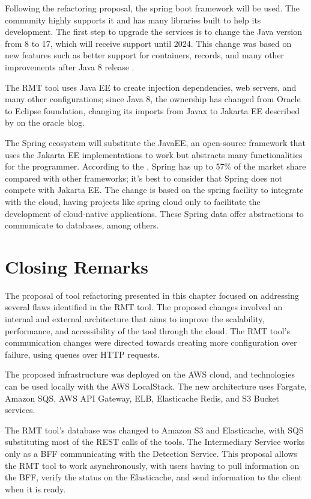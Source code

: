 Following the refactoring proposal, the spring boot framework will be used. The community highly supports it and has many libraries built to help its development.
The first step to upgrade the services is to change the Java version from 8 to 17, which will receive support until 2024. This change was based on new features such as better support for containers, records, and many other improvements after Java 8 release \cite{java8to17}. 

The RMT tool uses Java EE to create injection dependencies, web servers, and many other configurations; since Java 8, the ownership has changed from Oracle to Eclipse foundation, changing its imports from Javax to Jakarta EE described by \textcite{java8to17} on the oracle blog.

The Spring ecosystem will substitute the JavaEE, an open-source framework that uses the Jakarta EE implementations to work but abstracts many functionalities for the programmer. According to the \textcite{javasurvey}, Spring has up to 57\% of the market share compared with other frameworks; it's best to consider that Spring does not compete with Jakarta EE. The change is based on the spring facility to integrate with the cloud, having projects like spring cloud only to facilitate the development of cloud-native applications. These Spring data offer abstractions to communicate to databases, among others.

\section{Closing Remarks}
\label{sec-closingproposal}
The proposal of tool refactoring presented in this chapter focused on addressing several flaws identified in the RMT tool. The proposed changes involved an internal and external architecture that aims to improve the scalability, performance, and accessibility of the tool through the cloud. The RMT tool's communication changes were directed towards creating more configuration over failure, using queues over HTTP requests. 

The proposed infrastructure was deployed on the AWS cloud, and technologies can be used locally with the AWS LocalStack. The new architecture uses Fargate, Amazon SQS, AWS API Gateway, ELB, Elasticache Redis, and S3 Bucket services. 

The RMT tool's database was changed to Amazon S3 and Elasticache, with SQS substituting most of the REST calls of the tools. The Intermediary Service works only as a BFF communicating with the Detection Service. This proposal allows the RMT tool to work asynchronously, with users having to pull information on the BFF, verify the status on the Elasticache, and send information to the client when it is ready.